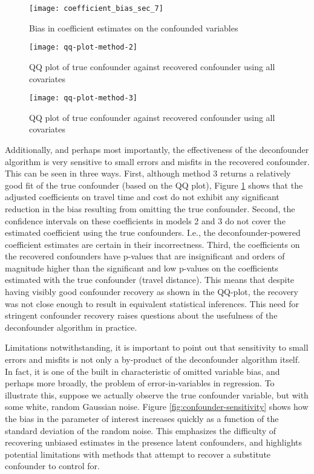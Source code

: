 \begin{figure}
   \centering
   \texttt{[image: coefficient\_bias\_sec\_7]}
   \caption{Bias in coefficient estimates on the confounded variables}
   \label{fig:bias-plot}
\end{figure}


\begin{figure}
   \centering
   \texttt{[image: qq-plot-method-2]}
   \caption{QQ plot of true confounder against recovered confounder using all covariates}
   \label{fig:qq-plot-method-2}
\end{figure}

\begin{figure}
   \centering
   \texttt{[image: qq-plot-method-3]}
   \caption{QQ plot of true confounder against recovered confounder using all covariates}
   \label{fig:qq-plot-method-3}
\end{figure}


Additionally, and perhaps most importantly, the effectiveness of the
deconfounder algorithm is very sensitive to small errors and misfits in the
recovered confounder.
This can be seen in three ways.
First, although method 3 returns a relatively good fit of the
true confounder (based on the QQ plot), Figure \ref{fig:bias-plot} shows that the adjusted coefficients on travel
time and cost do not exhibit any significant reduction in the bias resulting from
omitting the true confounder.
Second, the confidence intervals on these coefficients in models 2 and 3 do not cover the estimated coefficient using the true confounders.
I.e., the deconfounder-powered coefficient estimates are certain in their incorrectness.
Third, the coefficients on the recovered confounders have p-values that are insignificant and orders of magnitude higher than the significant and low p-values on the coefficients estimated with the true confounder (travel distance).
This means that despite having visibly good confounder recovery as shown in the QQ-plot, the recovery was not close enough to result in equivalent statistical inferences.
This need for stringent confounder recovery raises questions about the usefulness of the deconfounder algorithm in practice.

Limitations notwithstanding, it is
important to point out that sensitivity to small errors and misfits is not only a by-product of the deconfounder
algorithm itself. In fact, it is one of the built in characteristic of omitted
variable bias, and perhaps more broadly, the problem of error-in-variables in
regression. To illustrate this, suppose we actually observe the true
confounder variable, but with some white, random Gaussian noise. Figure \ref{fig:confounder-sensitivity}
shows how the bias in the parameter of interest increases quickly as a
function of the standard deviation of the random noise. This emphasizes the
difficulty of recovering unbiased estimates in the presence latent confounders,
and highlights potential limitations with methods that attempt to recover a
substitute confounder to control for.

